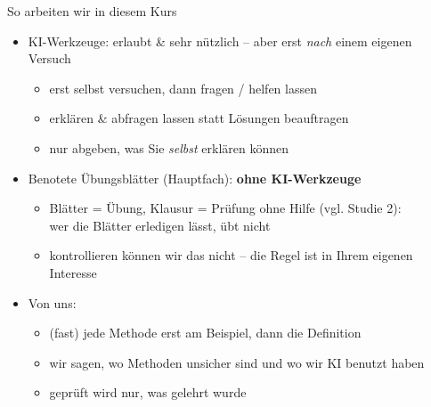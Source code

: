 \documentclass[
  10pt,
  ignorenonframetext,
]{beamer}
\providecommand{\tightlist}{%
  \setlength{\itemsep}{0pt}\setlength{\parskip}{0pt}}
\begin{document}
\begin{frame}{So arbeiten wir in diesem Kurs}
\protect\hypertarget{so-arbeiten-wir-in-diesem-kurs}{}
\begin{itemize}
\tightlist
\item
  KI-Werkzeuge: erlaubt \& sehr nützlich -- aber erst \emph{nach} einem
  eigenen Versuch

  \begin{itemize}
  \tightlist
  \item
    erst selbst versuchen, dann fragen / helfen lassen
  \item
    erklären \& abfragen lassen statt Lösungen beauftragen
  \item
    nur abgeben, was Sie \emph{selbst} erklären können
  \end{itemize}
\item
  Benotete Übungsblätter (Hauptfach): \textbf{ohne KI-Werkzeuge}

  \begin{itemize}
  \tightlist
  \item
    Blätter = Übung, Klausur = Prüfung ohne Hilfe (vgl. Studie 2):\\
    wer die Blätter erledigen lässt, übt nicht
  \item
    kontrollieren können wir das nicht -- die Regel ist in Ihrem eigenen
    Interesse
  \end{itemize}
\item
  Von uns:

  \begin{itemize}
  \tightlist
  \item
    (fast) jede Methode erst am Beispiel, dann die Definition
  \item
    wir sagen, wo Methoden unsicher sind und wo wir KI benutzt haben
  \item
    geprüft wird nur, was gelehrt wurde
  \end{itemize}
\end{itemize}
\end{frame}
\end{document}
